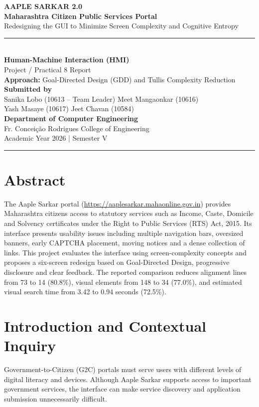 \documentclass[10pt,a4paper]{article}
\begin{document}
\begin{center}
{\LARGE\bfseries\color{primaryblue} AAPLE SARKAR 2.0}\\[2pt]
{\large\bfseries Maharashtra Citizen Public Services Portal}\\[4pt]
{\normalsize Redesigning the GUI to Minimize Screen Complexity and Cognitive Entropy}\\[6pt]
\rule{0.9\textwidth}{1pt}\\[5pt]
{\large\bfseries Human-Machine Interaction (HMI)}\\
{\normalsize Project / Practical 8 Report}\\[5pt]
{\small \textbf{Approach:} Goal-Directed Design (GDD) and Tullis Complexity Reduction}\\[6pt]
\textbf{Submitted by}\\
Sanika Lobo (10613 -- Team Leader) \quad Meet Mangaonkar (10616)\\
Yash Masaye (10617) \quad Jeet Chavan (10584)\\[4pt]
\textbf{Department of Computer Engineering}\\
Fr. Concei\c{c}\~ao Rodrigues College of Engineering\\
Academic Year 2026 \quad | \quad Semester V
\rule{0.9\textwidth}{0.6pt}
\end{center}

\section*{Abstract}
The Aaple Sarkar portal (\url{https://aaplesarkar.mahaonline.gov.in}) provides Maharashtra citizens access to statutory services such as Income, Caste, Domicile and Solvency certificates under the Right to Public Services (RTS) Act, 2015. Its interface presents usability issues including multiple navigation bars, oversized banners, early CAPTCHA placement, moving notices and a dense collection of links. This project evaluates the interface using screen-complexity concepts and proposes a six-screen redesign based on Goal-Directed Design, progressive disclosure and clear feedback. The reported comparison reduces alignment lines from 73 to 14 (80.8\%), visual elements from 148 to 34 (77.0\%), and estimated visual search time from 3.42 to 0.94 seconds (72.5\%).

\section{Introduction and Contextual Inquiry}
Government-to-Citizen (G2C) portals must serve users with different levels of digital literacy and devices. Although Aaple Sarkar supports access to important government services, the interface can make service discovery and application submission unnecessarily difficult.
\end{document}
